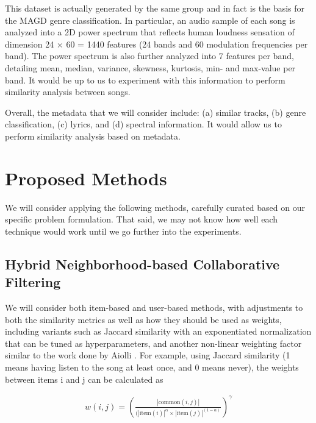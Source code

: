 \documentclass[10pt]{article}
\begin{document}
This dataset is actually generated by the same group and in fact is the basis for the MAGD genre classification. In particular, an audio sample of each song is analyzed into a 2D power spectrum that reflects human loudness sensation \cite{lidy2005evaluation} of dimension 24 $\times$ 60 = 1440 features (24 bands and 60 modulation frequencies per band). The power spectrum is also further analyzed into 7 features per band, detailing mean, median, variance, skewness, kurtosis, min- and max-value per band. It would be up to us to experiment with this information to perform similarity analysis between songs.

Overall, the metadata that we will consider include: (a) similar tracks, (b) genre classification, (c) lyrics, and (d) spectral information. It would allow us to perform similarity analysis based on metadata.

\section{Proposed Methods}

We will consider applying the following methods, carefully curated based on our specific problem formulation. That said, we may not know how well each technique would work until we go further into the experiments.

\subsection{Hybrid Neighborhood-based Collaborative Filtering}

We will consider both item-based and user-based methods, with adjustments to both the similarity metrics as well as how they should be used as weights, including variants such as Jaccard similarity with an exponentiated normalization that can be tuned as hyperparameters, and another non-linear weighting factor similar to the work done by Aiolli
\cite{aiolli2013efficient}. For example, using Jaccard similarity (1 means having listen to the song at least once, and 0 means never), the weights between items i and j can be calculated as

\begin{eqnarray*}
w(i, j) = \left(\frac{|\textrm{common}(i, j)|}{(|\textrm{item}(i)|^\alpha \times |\textrm{item}(j)|^{(1-\alpha)}}\right)^\gamma
\end{eqnarray*}
\end{document}
